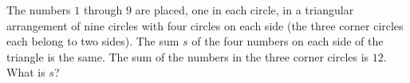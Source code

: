 The numbers $1$ through $9$ are placed, one in each circle, in a triangular arrangement of nine circles with four circles on each side (the three corner circles each belong to two sides). The sum $s$ of the four numbers on each side of the triangle is the same. The sum of the numbers in the three corner circles is $12$. What is $s$?
